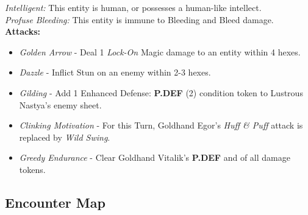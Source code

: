 \emph{Intelligent:} This entity is human, or possesses a human-like intellect.\\

\emph{Profuse Bleeding:} This entity is immune to Bleeding and Bleed damage.\\

\textbf{Attacks:}
\begin{itemize}
\item \emph{Golden Arrow} -  Deal 1 \emph{Lock-On} Magic damage to an entity within 4 hexes.
\item \emph{Dazzle} - Inflict Stun on an enemy within 2-3 hexes.
\item \emph{Gilding} - Add 1 Enhanced Defense: \textbf{P.DEF} (2) condition token to Lustrous Nastya’s enemy sheet.
\item \emph{Clinking Motivation} - For this Turn, Goldhand Egor’s \emph{Huff \& Puff} attack is replaced by \emph{Wild Swing}.
\item \emph{Greedy Endurance} - Clear Goldhand Vitalik’s \textbf{P.DEF} and  of all damage tokens. 
\end{itemize}

\pagebreak

\subsection*{Encounter Map}
\begin{center}
\end{center}

